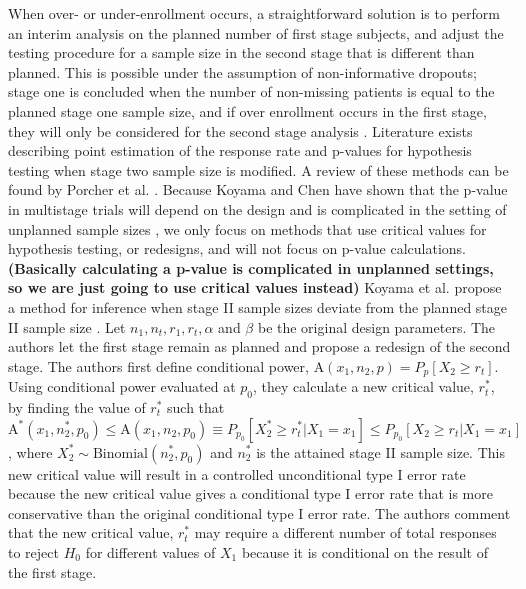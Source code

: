 \documentclass[12pt]{report}\usepackage[]{graphicx}\usepackage[]{color}
\newlength{\li}\setlength{\li}{14.48pt}
\newlength{\di}\setlength{\di}{-3.5mm}
\begin{document}
When over- or under-enrollment occurs, a straightforward solution is to perform an interim analysis on the planned number of first stage subjects, and adjust the testing procedure for a sample size in the second stage that is different than planned. This is possible under the assumption of non-informative dropouts; stage one is concluded when the number of non-missing patients is equal to the planned stage one sample size, and if over enrollment occurs in the first stage, they will only be considered for the second stage analysis \cite{Koyama}. Literature exists describing point estimation of the response rate and p-values for hypothesis testing when stage two sample size is modified. A review of these methods can be found by Porcher et al. \cite{Porcher}. Because Koyama and Chen have shown that the p-value in multistage trials will depend on the design and is complicated in the setting of unplanned sample sizes \cite{Koyama}, we only focus on methods that use critical values for hypothesis testing, or redesigns, and will not focus on p-value calculations. \textbf{(Basically calculating a p-value is complicated in unplanned settings, so we are just going to use critical values instead)} Koyama et al. propose a method for inference when stage II sample sizes deviate from the planned stage II sample size \cite{Koyama}. Let $n_1, n_t, r_1, r_t, \alpha$ and $\beta$ be the original design parameters. The authors let the first stage remain as planned and propose a redesign of the second stage. The authors first define conditional power, $\mbox{A}(x_1, n_2, p) = P_p[X_2 \geq r_t].$ Using conditional power evaluated at $p_0$, they calculate a new critical value, $r_t^\ast$, by finding the value of $r_t^\ast$ such that $\mbox{A}^\ast(x_1, n_2^\ast, p_0) \leq \mbox{A}(x_1, n_2, p_0) \equiv P_{p_0}[X_2^\ast \geq r_t^\ast | X_1 = x_1] \leq P_{p_0}[X_2 \geq r_t | X_1 = x_1]$, where $X_2^\ast \sim \mbox{Binomial}(n_2^\ast, p_0)$ and $n_2^\ast$ is the attained stage II sample size. This new critical value will result in a controlled unconditional type I error rate because the new critical value gives a conditional type I error rate that is more conservative than the original conditional type I error rate. The authors comment that the new critical value, $r_t^\ast$ may require a different number of total responses to reject $H_0$ for different values of $X_1$ because it is conditional on the result of the first stage. 

\newpage
\end{document}
